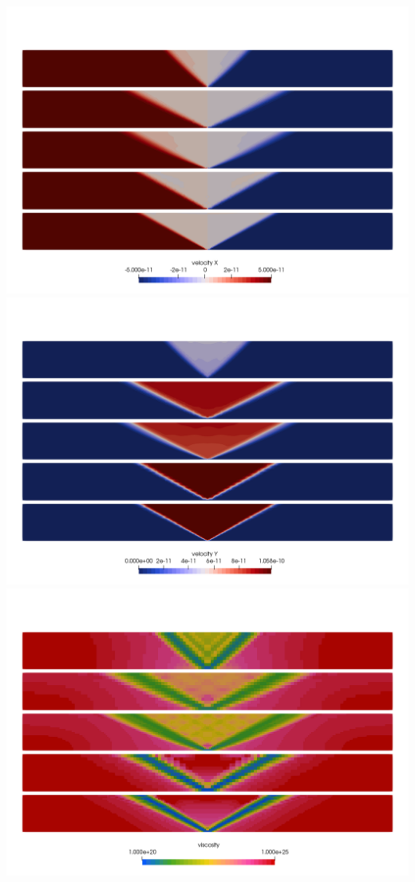 \begin{center}
\includegraphics[width=.8\linewidth]{python_codes/fieldstone_39/images/compression_u}\\
\includegraphics[width=.8\linewidth]{python_codes/fieldstone_39/images/compression_v}\\
\includegraphics[width=.8\linewidth]{python_codes/fieldstone_39/images/compression_mueff}\\

\end{center}
